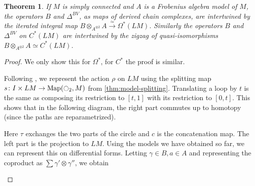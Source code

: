 \documentclass{scrartcl}
\theoremstyle{plain}
\newtheorem{theorem}{Theorem}[section]
\theoremstyle{definition}
\newcommand{\quiso}{\simeq}
\let\xto\xrightarrow
\DeclareMathOperator{\Map}{Map}
\begin{document}
\begin{theorem}\label{thm:bv-iso}
    If $M$ is simply connected and $A$ is a Frobenius algebra model of $M$, the operators $B$ and $\Delta^{BV}$, as maps of derived chain complexes, are intertwined by the iterated integral map $B\otimes_{A^{\otimes 2}} A \xto{\quiso}\Omega^*(LM)$. Similarly the operators $B$ and $\Delta^{BV}$ on $C^*(LM)$ are intertwined by the zigzag of quasi-isomorphisms $B\otimes_{A^{\otimes 2}} A \quiso C^*(LM)$. 
\end{theorem}

\begin{proof}
    We only show this for $\Omega^*$, for $C^*$ the proof is similar. 

Following \cite{naef2019string}, we represent the action $\rho$ on $LM$ using the splitting map $s\colon I \times LM\to\Map(\ocircle_2, M)$ from \cref{thm:model-splitting}. Translating a loop by $t$ is the same as composing its restriction to $[t, 1]$ with its restriction to $[0, t]$. This shows that in the following diagram, the right part commutes up to homotopy (since the paths are reparametrized).

\begin{center}
\end{center}
Here $\tau$ exchanges the two parts of the circle and $c$ is the concatenation map. The left part is the projection to $LM$. Using the models we have obtained so far, we can represent this on differential forms. Letting $\gamma\in B, a\in A$ and representing the coproduct as $\sum \gamma'\otimes\gamma''$, we obtain 

\begin{center}
\end{center}


\end{proof}
\end{document}
